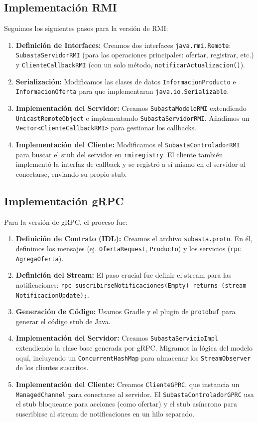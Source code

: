 \documentclass[11pt, a4paper]{article}
\begin{document}
\subsection{Implementación RMI}
Seguimos los siguientes pasos para la versión de RMI:
\begin{enumerate}
    \item \textbf{Definición de Interfaces:} Creamos dos interfaces \texttt{java.rmi.Remote}: \texttt{SubastaServidorRMI} (para las operaciones principales: ofertar, registrar, etc.) y \texttt{ClienteCallbackRMI} (con un solo método, \texttt{notificarActualizacion()}).
\item \textbf{Serialización:} Modificamos las clases de datos \texttt{InformacionProducto} e \texttt{InformacionOferta} para que implementaran \texttt{java.io.Serializable}.
\item \textbf{Implementación del Servidor:} Creamos \texttt{SubastaModeloRMI} extendiendo \texttt{UnicastRemoteObject} e implementando \texttt{SubastaServidorRMI}. Añadimos un \texttt{Vector<ClienteCallbackRMI>} para gestionar los callbacks.
\item \textbf{Implementación del Cliente:} Modificamos el \texttt{SubastaControladorRMI} para buscar el stub del servidor en \texttt{rmiregistry}.
El cliente también implementó la interfaz de callback y se registró a sí mismo en el servidor al conectarse, enviando su propio stub.
\end{enumerate}

\subsection{Implementación gRPC}
Para la versión de gRPC, el proceso fue:
\begin{enumerate}
    \item \textbf{Definición de Contrato (IDL):} Creamos el archivo \texttt{subasta.proto}. En él, definimos los mensajes (ej. \texttt{OfertaRequest}, \texttt{Producto}) y los servicios (\texttt{rpc AgregaOferta}).
\item \textbf{Definición del Stream:} El paso crucial fue definir el stream para las notificaciones: \texttt{rpc suscribirseNotificaciones(Empty) returns (stream NotificacionUpdate);}.
\item \textbf{Generación de Código:} Usamos Gradle y el plugin de \texttt{protobuf} para generar el código stub de Java.
\item \textbf{Implementación del Servidor:} Creamos \texttt{SubastaServicioImpl} extendiendo la clase base generada por gRPC.
Migramos la lógica del modelo aquí, incluyendo un \texttt{ConcurrentHashMap} para almacenar los \texttt{StreamObserver} de los clientes suscritos.
\item \textbf{Implementación del Cliente:} Creamos \texttt{ClienteGPRC}, que instancia un \texttt{ManagedChannel} para conectarse al servidor.
El \texttt{SubastaControladorGPRC} usa el stub bloqueante para acciones (como ofertar) y el stub asíncrono para suscribirse al stream de notificaciones en un hilo separado.
\end{enumerate}
\end{document}
